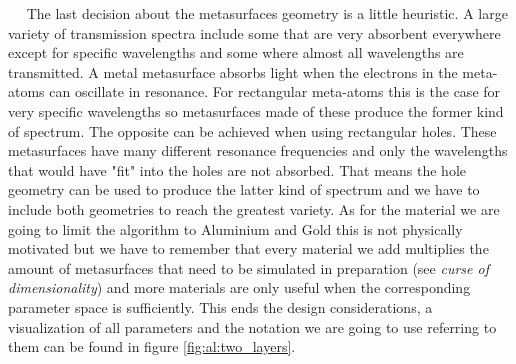 $\quad$ The last decision about the metasurfaces geometry is a little heuristic. A large variety of transmission spectra include some that are very absorbent everywhere except for specific wavelengths and some where almost all wavelengths are transmitted. A metal metasurface absorbs light when the electrons in the meta-atoms can oscillate in resonance. For rectangular meta-atoms this is the case for very specific wavelengths so metasurfaces made of these produce the former kind of spectrum. The opposite can be achieved when using rectangular holes. These metasurfaces have many different resonance frequencies and only the wavelengths that would have "fit" into the holes are not absorbed. That means the hole geometry can be used to produce the latter kind of spectrum and we have to include both geometries to reach the greatest variety.
As for the material we are going to limit the algorithm to Aluminium and Gold this is not physically motivated but we have to remember that every material we add multiplies the amount of metasurfaces that need to be simulated in preparation (see \textit{curse of dimensionality}) and more materials are only useful when the corresponding parameter space is sufficiently.
This ends the design considerations, a visualization of all parameters and the notation we are going to use referring to them can be found in figure \ref{fig:al:two_layers}.
